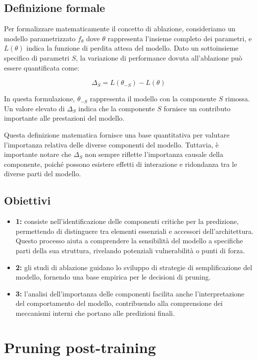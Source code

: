 \documentclass[a4paper,12pt]{report}
\begin{document}
	\subsection{Definizione formale}
	Per formalizzare matematicamente il concetto di ablazione, consideriamo un modello parametrizzato $f_\theta$ dove $\theta$ rappresenta l'insieme completo dei parametri, e $L(\theta)$ indica la funzione di perdita attesa del modello. Dato un sottoinsieme specifico di parametri $S$, la variazione di performance dovuta all'ablazione può essere quantificata come:
	
	\[
	\Delta_S = L(\theta_{-S}) - L(\theta)
	\]
	
	In questa formulazione, $\theta_{-S}$ rappresenta il modello con la componente $S$ rimossa. Un valore elevato di $\Delta_S$ indica che la componente $S$ fornisce un contributo importante alle prestazioni del modello.
	
	Questa definizione matematica fornisce una base quantitativa per valutare l'importanza relativa delle diverse componenti del modello. Tuttavia, è importante notare che $\Delta_S$ non sempre riflette l'importanza causale della componente, poiché possono esistere effetti di interazione e ridondanza tra le diverse parti del modello.
	
	\subsection{Obiettivi}
	\begin{itemize}
		\item \textbf{1:} consiste nell'identificazione delle componenti critiche per la predizione, permettendo di distinguere tra elementi essenziali e accessori dell'architettura. Questo processo aiuta a comprendere la sensibilità del modello a specifiche parti della sua struttura, rivelando potenziali vulnerabilità o punti di forza.
		\item \textbf{2:} gli studi di ablazione guidano lo sviluppo di strategie di semplificazione del modello, fornendo una base empirica per le decisioni di pruning.
		\item \textbf{3:} l'analisi dell'importanza delle componenti facilita anche l'interpretazione del comportamento del modello, contribuendo alla comprensione dei meccanismi interni che portano alle predizioni finali.
	\end{itemize}
	
	\section{Pruning post-training}
	
\end{document}
